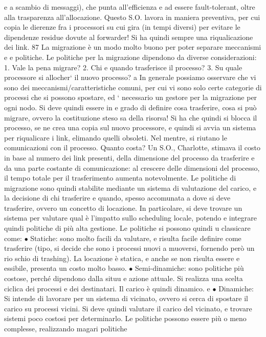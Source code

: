 e
a scambio di messaggi), che punta all'efficienza e ad essere fault-tolerant, oltre
alla trasparenza all'allocazione. Questo S.O. lavora in maniera preventiva, per
cui copia le dierenze fra i processori su cui gira (in tempi diversi) per evitare
le dipendenze residue dovute al forwarder! Si ha quindi sempre una riqualicazione dei link.
87
La migrazione è un modo molto buono per poter separare meccanismi e
e
politiche. Le politiche per la migrazione dipendono da diverse considerazioni:
1. Vale la pena migrare?
2. Chi e quando trasferisce il processo?
3. Su quale processore si allocher` il nuovo processo?
a
In generale possiamo osservare che vi sono dei meccanismi/caratteristiche comuni, per cui vi sono solo certe categorie
di processi che si possono spostare, ed
` necessario un gestore per la migrazione per ogni nodo. Si deve quindi essere in
e
grado di definire cosa trasferire, cosa si può migrare, ovvero la costituzione steso
sa della risorsa! Si ha che quindi si blocca il processo, se ne crea una copia sul
nuovo processore, e quindi si avvia un sistema per riqualicare i link, elimando
quelli obsoleti. Nel mentre, si riutano le comunicazioni con il processo.
Quanto costa? Un S.O., Charlotte, stimava il costo in base al numero dei
link presenti, della dimensione del processo da trasferire e da una parte costante
di comunicazione: al crescere delle dimensioni del processo, il tempo totale per
il trasferimento aumenta notevolmente.
Le politiche di migrazione sono quindi stabilite mediante un sistema di valutazione del carico, e la decisione di chi
trasferire e quando, spesso accomunata
a dove si deve trasferire, ovvero un concetto di locazione. In particolare, si deve
trovare un sistema per valutare qual è l'impatto sullo scheduling locale, potendo
e
integrare quindi politiche di più alta gestione. Le politiche si possono quindi
u
classicare come:
$\bullet$ Statiche: sono molto facili da valutare, e risulta facile definire come trasferire
(tipo, si decide che sono i processi nuovi a muoversi, fornendo però un rio
schio di trashing). La locazione è statica, e anche se non risulta essere
e
essibile, presenta un costo molto basso.
$\bullet$ Semi-dinamiche: sono politiche più costose, perché dipendono dalla situu
e
azione attuale. Si realizza una scelta ciclica dei processi e dei destinatari.
Il carico è quindi dinamico.
e
$\bullet$ Dinamiche: Si intende di lavorare per un sistema di vicinato, ovvero si
cerca di spostare il carico su processi vicini. Si deve quindi valutare il
carico del vicinato, e trovare sistemi poco costosi per determinarlo.
Le politiche possono essere più o meno complesse, realizzando magari politiche
